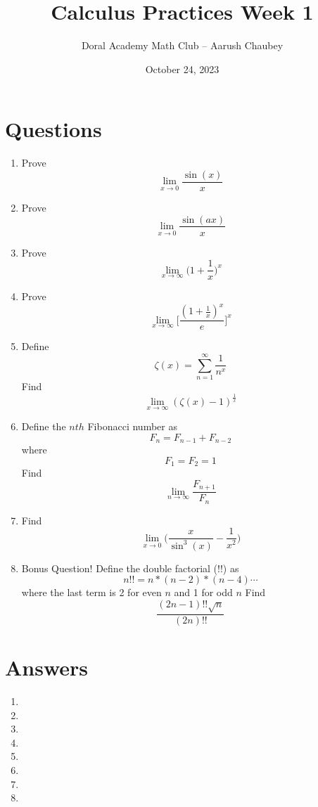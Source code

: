\documentclass{article}
\title{Calculus Practices Week 1}
\author{Doral Academy Math Club -- Aarush Chaubey}
\date{October 24, 2023}
\begin{document}
\maketitle
\section{Questions}
\begin{enumerate}
    \item Prove \[\lim_{x \to 0} \frac{\sin(x)}{x}\]
    \item Prove \[\lim_{x \to 0} \frac{\sin(ax)}{x}\]
    \item Prove \[\lim_{x \to \infty} \Big(1+\frac{1}{x}\Big)^x\]
    \item Prove \[\lim_{x \to \infty} \Big[\frac{(1+\frac{1}{x})^x}{e}\Big]^x\]
    \item Define \[\zeta(x) = \sum_{n=1}^{\infty}\frac{1}{n^x}\] Find \[\lim_{x \to \infty} (\zeta(x)-1)^{\frac{1}{x}}\]
    \item Define the $nth$ Fibonacci number as \[F_n=F_{n-1}+F_{n-2}\] where \[F_1=F_2=1\] Find \[\lim_{n \to \infty} \frac{F_{n+1}}{F_n}\]
    \item Find \[\lim_{x \to 0} \Big(\frac{x}{\sin^3(x)}-\frac{1}{x^2}\Big)\]
    \item Bonus Question! Define the double factorial (!!) as \[n!!=n*(n-2)*(n-4)\cdots\] where the last term is 2 for even $n$ and 1 for odd $n$ Find \[\frac{(2n-1)!!\sqrt{n}}{(2n)!!}\]
\end{enumerate}
\section{Answers}
\begin{enumerate}
    \item {}
    \item {}
    \item {}
    \item {}
    \item {}
    \item {}
    \item {}
    \item {}
    
\end{enumerate}
\end{document}
